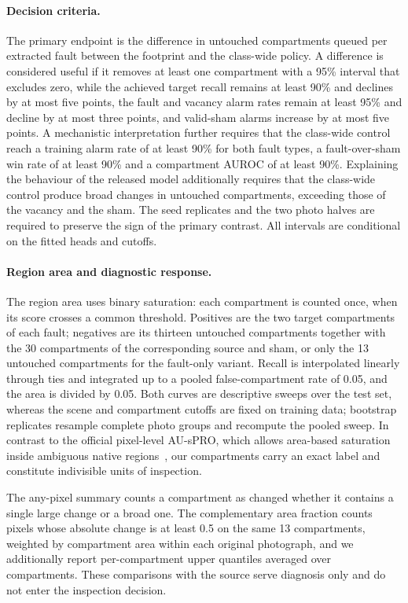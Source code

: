 \paragraph{Decision criteria.}
The primary endpoint is the difference in untouched compartments queued per extracted fault between the footprint and the class-wide policy. A difference is considered useful if it removes at least one compartment with a 95\% interval that excludes zero, while the achieved target recall remains at least 90\% and declines by at most five points, the fault and vacancy alarm rates remain at least 95\% and decline by at most three points, and valid-sham alarms increase by at most five points. A mechanistic interpretation further requires that the class-wide control reach a training alarm rate of at least 90\% for both fault types, a fault-over-sham win rate of at least 90\% and a compartment AUROC of at least 90\%. Explaining the behaviour of the released model additionally requires that the class-wide control produce broad changes in untouched compartments, exceeding those of the vacancy and the sham. The seed replicates and the two photo halves are required to preserve the sign of the primary contrast. All intervals are conditional on the fitted heads and cutoffs.

\paragraph{Region area and diagnostic response.}
The region area uses binary saturation: each compartment is counted once, when its score crosses a common threshold. Positives are the two target compartments of each fault; negatives are its thirteen untouched compartments together with the 30 compartments of the corresponding source and sham, or only the 13 untouched compartments for the fault-only variant. Recall is interpolated linearly through ties and integrated up to a pooled false-compartment rate of 0.05, and the area is divided by 0.05. Both curves are descriptive sweeps over the test set, whereas the scene and compartment cutoffs are fixed on training data; bootstrap replicates resample complete photo groups and recompute the pooled sweep. In contrast to the official pixel-level AU-sPRO, which allows area-based saturation inside ambiguous native regions~\cite{bergmann2022}, our compartments carry an exact label and constitute indivisible units of inspection.

The any-pixel summary counts a compartment as changed whether it contains a single large change or a broad one. The complementary area fraction counts pixels whose absolute change is at least 0.5 on the same 13 compartments, weighted by compartment area within each original photograph, and we additionally report per-compartment upper quantiles averaged over compartments. These comparisons with the source serve diagnosis only and do not enter the inspection decision.
